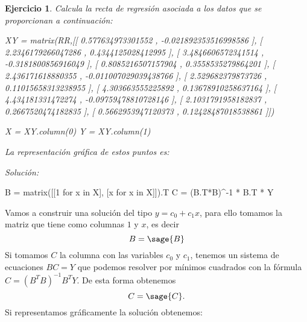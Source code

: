 \documentclass{amsart}
\newtheorem{ejer}{Ejercicio}
\begin{document}
\begin{ejer} 
Calcula la recta de regresión asociada a los datos que se proporcionan a continuación:
\begin{sageblock}
XY = matrix(RR,[[ 0.577634973301552 ,  -0.021892353516998586 ],
                [ 2.2346179266047286 ,  0.4344125028412995 ],
                [ 3.4846606572341514 ,  -0.3181800856916049 ],
                [ 0.8085216507157904 ,  0.3558535279864201 ],
                [ 2.436171618880355 ,  -0.011007029039438766 ],
                [ 2.529682379873726 ,  0.11015658313238955 ],
                [ 4.303663555225892 ,  0.13678910258637164 ],
                [ 4.434181331472274 ,  -0.09759478810728146 ],
                [ 2.1031791958182837 ,  0.2667520474182835 ],
                [ 0.5662953947120373 ,  0.12428487018538861 ]])

X = XY.column(0)
Y = XY.column(1)
\end{sageblock}

La representación gráfica de estos puntos es:

\begin{sagesub}
\begin{center}
\end{center}
\end{sagesub}


\end{ejer} 

{\it Solución:}


\begin{sageblock}
B = matrix([[1 for x in X],
            [x for x in X]]).T
C = (B.T*B)^-1 * B.T * Y
\end{sageblock}

Vamos a construir una solución del tipo $y = c_0 + c_1 x$, para ello tomamos
la matriz que tiene como columnas $1$ y $x$, es decir
$$ B = \sage{B} $$
Si tomamos $C$ la columna con las variables $c_0$ y $c_1$, tenemos un sistema 
de ecuaciones $B C = Y$ que podemos resolver por mínimos cuadrados con la fórmula
$C = (B^T B)^{-1} B^T Y$. De esta forma obtenemos 
$$ C = \sage{C}.$$
Si representamos gráficamente la solución obtenemos:
\end{document}
